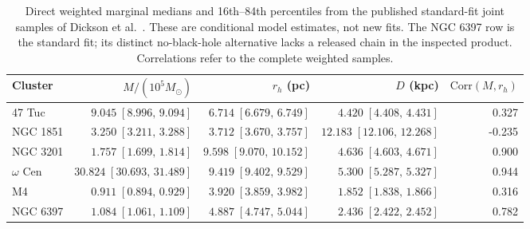\begin{table}[t]
\caption{Direct weighted marginal medians and 16th--84th percentiles from the published standard-fit joint samples of Dickson et al.~\cite{Dickson2023,Dickson2024}. These are conditional model estimates, not new fits. The NGC 6397 row is the standard fit; its distinct no-black-hole alternative lacks a released chain in the inspected product. Correlations refer to the complete weighted samples.}\label{tab:cluster-posterior}
\centering\begin{tabular}{lrrrr}
\toprule
Cluster & $M/(10^5 M_\odot)$ & $r_h$ (pc) & $D$ (kpc) & $\mathrm{Corr}(M,r_h)$ \\
\midrule
47 Tuc & $9.045\;[8.996,\,9.094]$ & $6.714\;[6.679,\,6.749]$ & $4.420\;[4.408,\,4.431]$ & 0.327 \\
NGC 1851 & $3.250\;[3.211,\,3.288]$ & $3.712\;[3.670,\,3.757]$ & $12.183\;[12.106,\,12.268]$ & -0.235 \\
NGC 3201 & $1.757\;[1.699,\,1.814]$ & $9.598\;[9.070,\,10.152]$ & $4.636\;[4.603,\,4.671]$ & 0.900 \\
$\omega$ Cen & $30.824\;[30.693,\,31.489]$ & $9.419\;[9.402,\,9.529]$ & $5.300\;[5.287,\,5.327]$ & 0.944 \\
M4 & $0.911\;[0.894,\,0.929]$ & $3.920\;[3.859,\,3.982]$ & $1.852\;[1.838,\,1.866]$ & 0.316 \\
NGC 6397 & $1.084\;[1.061,\,1.109]$ & $4.887\;[4.747,\,5.044]$ & $2.436\;[2.422,\,2.452]$ & 0.782 \\
\bottomrule
\end{tabular}
\end{table}
